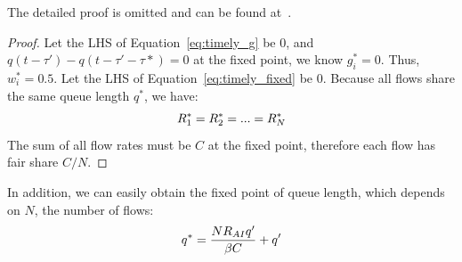 The detailed proof is omitted and can be found at~\cite{patchedtimelyproof}.



\begin{proof}
Let the LHS of Equation~\ref{eq:timely_g} be 0, and $q(t - \tau ') - q(t - \tau ' - \tau *) = 0$ at the fixed 
point, we know $g_i^*=0$. Thus, $w_i^*=0.5$. Let the LHS of Equation~\ref{eq:timely_fixed} be 0. Because
all flows share the same queue length $q^*$, we have:
\begin{equation}
\small
R_1^* = R_2^* = ... = R_N^*
\end{equation}
The sum of all flow rates must be $C$ at the fixed point, therefore each flow has fair share $C/N$. 
\end{proof}
In addition, we can easily obtain the fixed point of queue length, which depends on $N$, the number of flows:
\begin{equation}
\small
{q^*} = \frac{{N{R_{AI}}q'}}{{\beta C}} + q'
\label{eq:timely_fixed_q}
\end{equation}

